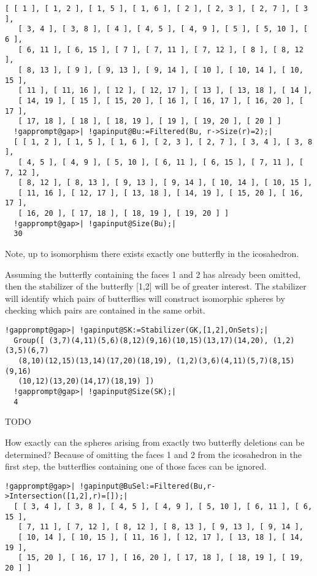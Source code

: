 \documentclass[a4paper,11pt]{report}
\begin{document}
{{\begin{Verbatim}[commandchars=!@|,fontsize=\small,frame=single,label=Example]
  [ [ 1 ], [ 1, 2 ], [ 1, 5 ], [ 1, 6 ], [ 2 ], [ 2, 3 ], [ 2, 7 ], [ 3 ], 
   [ 3, 4 ], [ 3, 8 ], [ 4 ], [ 4, 5 ], [ 4, 9 ], [ 5 ], [ 5, 10 ], [ 6 ], 
   [ 6, 11 ], [ 6, 15 ], [ 7 ], [ 7, 11 ], [ 7, 12 ], [ 8 ], [ 8, 12 ], 
   [ 8, 13 ], [ 9 ], [ 9, 13 ], [ 9, 14 ], [ 10 ], [ 10, 14 ], [ 10, 15 ], 
   [ 11 ], [ 11, 16 ], [ 12 ], [ 12, 17 ], [ 13 ], [ 13, 18 ], [ 14 ], 
   [ 14, 19 ], [ 15 ], [ 15, 20 ], [ 16 ], [ 16, 17 ], [ 16, 20 ], [ 17 ], 
   [ 17, 18 ], [ 18 ], [ 18, 19 ], [ 19 ], [ 19, 20 ], [ 20 ] ]
  !gapprompt@gap>| !gapinput@Bu:=Filtered(Bu, r->Size(r)=2);|
  [ [ 1, 2 ], [ 1, 5 ], [ 1, 6 ], [ 2, 3 ], [ 2, 7 ], [ 3, 4 ], [ 3, 8 ], 
   [ 4, 5 ], [ 4, 9 ], [ 5, 10 ], [ 6, 11 ], [ 6, 15 ], [ 7, 11 ], [ 7, 12 ], 
   [ 8, 12 ], [ 8, 13 ], [ 9, 13 ], [ 9, 14 ], [ 10, 14 ], [ 10, 15 ], 
   [ 11, 16 ], [ 12, 17 ], [ 13, 18 ], [ 14, 19 ], [ 15, 20 ], [ 16, 17 ], 
   [ 16, 20 ], [ 17, 18 ], [ 18, 19 ], [ 19, 20 ] ]
  !gapprompt@gap>| !gapinput@Size(Bu);|
  30
\end{Verbatim}
 

 Note, up to isomorphism there exists exactly one butterfly in the icosahedron. 

 Assuming the butterfly containing the faces 1 and 2 has already been omitted,
then the stabilizer of the butterfly [1,2] will be of greater interest. The
stabilizer will identify which pairs of butterflies will construct isomorphic
spheres by checking which pairs are contained in the same orbit. 

 
\begin{Verbatim}[commandchars=!@|,fontsize=\small,frame=single,label=Example]
  !gapprompt@gap>| !gapinput@SK:=Stabilizer(GK,[1,2],OnSets);|
  Group([ (3,7)(4,11)(5,6)(8,12)(9,16)(10,15)(13,17)(14,20), (1,2)(3,5)(6,7)
   (8,10)(12,15)(13,14)(17,20)(18,19), (1,2)(3,6)(4,11)(5,7)(8,15)(9,16)
   (10,12)(13,20)(14,17)(18,19) ])
  !gapprompt@gap>| !gapinput@Size(SK);|
  4
\end{Verbatim}
 

 TODO 
%
 

 How exactly can the spheres arising from exactly two butterfly deletions can
be determined? Because of omitting the faces 1 and 2 from the icosahedron in
the first step, the butterflies containing one of those faces can be ignored. 

 
\begin{Verbatim}[commandchars=!@|,fontsize=\small,frame=single,label=Example]
  !gapprompt@gap>| !gapinput@BuSel:=Filtered(Bu,r->Intersection([1,2],r)=[]);|
  [ [ 3, 4 ], [ 3, 8 ], [ 4, 5 ], [ 4, 9 ], [ 5, 10 ], [ 6, 11 ], [ 6, 15 ], 
   [ 7, 11 ], [ 7, 12 ], [ 8, 12 ], [ 8, 13 ], [ 9, 13 ], [ 9, 14 ], 
   [ 10, 14 ], [ 10, 15 ], [ 11, 16 ], [ 12, 17 ], [ 13, 18 ], [ 14, 19 ], 
   [ 15, 20 ], [ 16, 17 ], [ 16, 20 ], [ 17, 18 ], [ 18, 19 ], [ 19, 20 ] ]
\end{Verbatim}
 

}}
\end{document}
